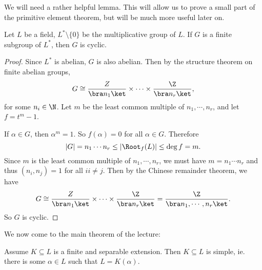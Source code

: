 \documentclass[a4paper]{article}
\begin{document}
We will need a rather helpful lemma. This will allow us to prove a small part of the primitive element theorem, but will be much more useful later on.
\begin{lemma}
  Let $L$ be a field, $L^*\setminus \{0\}$ be the multiplicative group of $L$. If $G$ is a finite subgroup of $L^*$, then $G$ is cyclic.
\end{lemma}

\begin{proof}
  Since $L^*$ is abelian, $G$ is also abelian. Then by the structure theorem on finite abelian groups,
  \[
    G \cong \frac{Z}{\bra n_1\ket} \times \cdots \times \frac{\Z}{\bra n_r\ket},
  \]
  for some $n_i \in \N$. Let $m$ be the least common multiple of $n_1, \cdots, n_r$, and let $f = t^m - 1$.

  If $\alpha \in G$, then $\alpha^m = 1$. So $f(\alpha) = 0$ for all $\alpha \in G$. Therefore
  \[
    |G| = n_1 \cdots n_r \leq |\Root_f(L)| \leq \deg f = m.
  \]
  Since $m$ is the least common multiple of $n_1, \cdots, n_r$, we must have $m = n_1 \cdots n_r$ and thus $(n_i, n_j) = 1$ for all $ii \not= j$. Then by the Chinese remainder theorem, we have
  \[
    G \cong \frac{Z}{\bra n_1\ket} \times \cdots \times \frac{\Z}{\bra n_r\ket} = \frac{\Z}{\bra n_1, \cdots, n_r\ket}.
  \]
  So $G$ is cyclic.
\end{proof}
We now come to the main theorem of the lecture:
\begin{thm}
  Assume $K\subseteq L$ is a finite and separable extension. Then $K\subseteq L$ is simple, ie. there is some $\alpha \in L$ such that $L = K(\alpha)$.
\end{thm}
\end{document}
